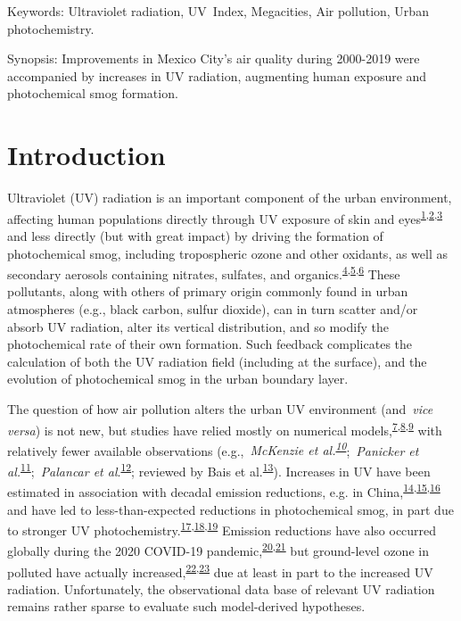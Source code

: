\documentclass[10pt]{article}
\begin{document}
\sloppy


Keywords: Ultraviolet radiation, UV~Index, Megacities, Air pollution,
Urban photochemistry.

Synopsis: Improvements in Mexico City's air quality during 2000-2019
were accompanied by increases in UV radiation, augmenting human exposure
and photochemical smog formation.

\section*{Introduction}

{\label{123750}}

Ultraviolet (UV) radiation is an important component of the urban
environment, affecting human populations directly through UV exposure of
skin and eyes\textsuperscript{\hyperref[csl:1]{1},\hyperref[csl:2]{2},\hyperref[csl:3]{3}} and less directly (but with great
impact) by driving the formation of photochemical smog, including
tropospheric ozone and other oxidants, as well as secondary aerosols
containing nitrates, sulfates, and organics.\textsuperscript{\hyperref[csl:4]{4},\hyperref[csl:5]{5},\hyperref[csl:6]{6}} These
pollutants, along with others of primary origin commonly found in urban
atmospheres (e.g., black carbon, sulfur dioxide), can in turn scatter
and/or absorb UV radiation, alter its vertical distribution, and so
modify the photochemical rate of their own formation. Such feedback
complicates the calculation of both the UV radiation field (including at
the surface), and the evolution of photochemical smog in the urban
boundary layer.

The question of how air pollution alters the urban UV environment
(and~\emph{vice versa}) is not new, but studies have relied mostly on
numerical models,\textsuperscript{\hyperref[csl:7]{7},\hyperref[csl:8]{8},\hyperref[csl:9]{9}} with relatively fewer available
observations (e.g.,~\emph{McKenzie et
al.\textsuperscript{\hyperref[csl:10]{10}}};~\emph{Panicker et
al.}\textsuperscript{\hyperref[csl:11]{11}};~\emph{Palancar et al}.\textsuperscript{\hyperref[csl:12]{12}};
reviewed by Bais et al.\textsuperscript{\hyperref[csl:13]{13}}). Increases in UV have been
estimated in association with decadal emission reductions, e.g. in
China,\textsuperscript{\hyperref[csl:14]{14},\hyperref[csl:15]{15},\hyperref[csl:16]{16}} and have led to less-than-expected reductions
in photochemical smog, in part due to stronger UV
photochemistry.\textsuperscript{\hyperref[csl:17]{17},\hyperref[csl:18]{18},\hyperref[csl:19]{19}} Emission reductions have also occurred
globally during the 2020 COVID-19 pandemic,\textsuperscript{\hyperref[csl:20]{20},\hyperref[csl:21]{21}} but
ground-level ozone in polluted have actually
increased,\textsuperscript{\hyperref[csl:22]{22},\hyperref[csl:23]{23}} due at least in part to the increased UV
radiation. Unfortunately, the observational data base of relevant UV
radiation remains rather sparse to evaluate such model-derived
hypotheses.~~
\end{document}

